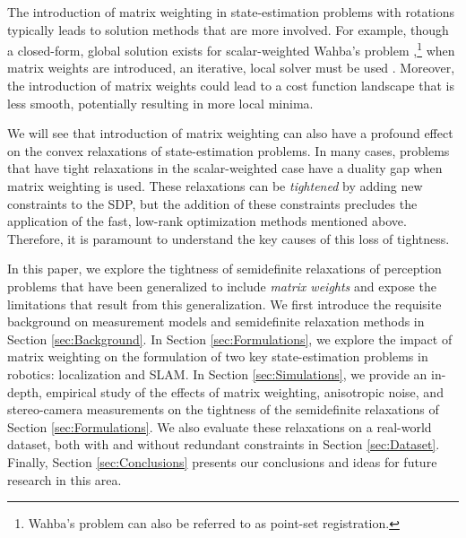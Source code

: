 \documentclass[lettersize,journal]{IEEEtran}
\begin{document}
The introduction of matrix weighting in state-estimation problems with rotations typically leads to solution methods that are more involved. For example, though a closed-form, global solution exists for scalar-weighted Wahba's problem \cite{hornClosedformSolutionAbsolute1987, hornClosedFormSolutionAbsolute1988, wahbaLeastSquaresEstimate1965},\footnote{Wahba's problem can also be referred to as point-set registration.} when matrix weights are introduced, an iterative, local solver must be used \cite{chengTotalLeastSquaresEstimate2019, barfootStateEstimationRobotics2017}. Moreover, the introduction of matrix weights could lead to a cost function landscape that is less smooth, potentially resulting in more local minima. 

We will see that introduction of matrix weighting can also have a profound effect on the convex relaxations of state-estimation problems. In many cases, problems that have tight relaxations in the scalar-weighted case have a duality gap when matrix weighting is used. These relaxations can be \emph{tightened} by adding new constraints to the SDP, but the addition of these constraints precludes the application of the fast, low-rank optimization methods mentioned above. Therefore, it is paramount to understand the key causes of this loss of tightness.

In this paper, we explore the tightness of semidefinite relaxations of perception problems that have been generalized to include \emph{matrix weights} and expose the limitations that result from this generalization. We first introduce the requisite background on measurement models and semidefinite relaxation methods in Section \ref{sec:Background}. In Section \ref{sec:Formulations}, we explore the impact of matrix weighting on the formulation of two key state-estimation problems in robotics: localization and SLAM.
In Section \ref{sec:Simulations}, we provide an in-depth, empirical study of the effects of matrix weighting, anisotropic noise, and stereo-camera measurements on the tightness of the semidefinite relaxations of Section \ref{sec:Formulations}. We also evaluate these relaxations on a real-world dataset, both with and without redundant constraints in Section \ref{sec:Dataset}. Finally, Section \ref{sec:Conclusions} presents our conclusions and ideas for future research in this area.
\end{document}
